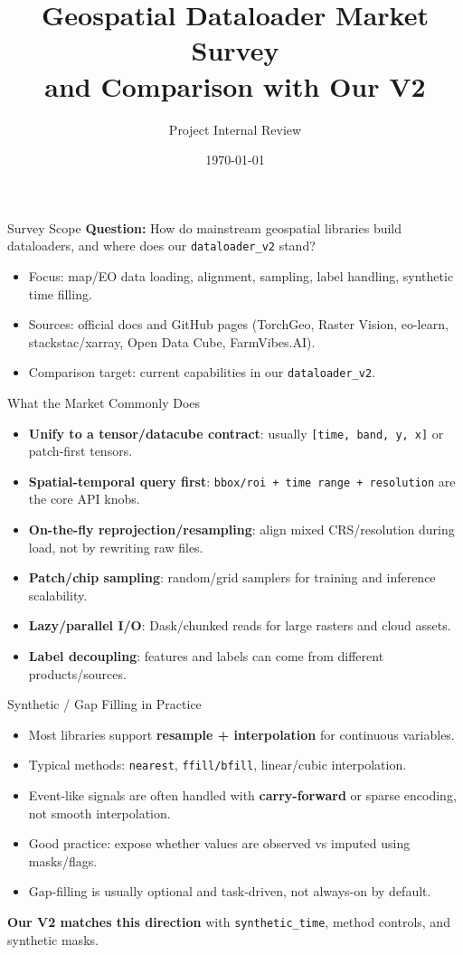 \documentclass{beamer}
\title{Geospatial Dataloader Market Survey\\and Comparison with Our V2}
\author{Project Internal Review}
\date{\today}
\begin{document}
\begin{frame}
  \titlepage
\end{frame}

\begin{frame}{Survey Scope}
\textbf{Question:} How do mainstream geospatial libraries build dataloaders, and where does our \texttt{dataloader\_v2} stand?
\vspace{0.5em}
\begin{itemize}
  \item Focus: map/EO data loading, alignment, sampling, label handling, synthetic time filling.
  \item Sources: official docs and GitHub pages (TorchGeo, Raster Vision, eo-learn, stackstac/xarray, Open Data Cube, FarmVibes.AI).
  \item Comparison target: current capabilities in our \texttt{dataloader\_v2}.
\end{itemize}
\end{frame}

\begin{frame}{What the Market Commonly Does}
\begin{itemize}
  \item \textbf{Unify to a tensor/datacube contract}: usually \texttt{[time, band, y, x]} or patch-first tensors.
  \item \textbf{Spatial-temporal query first}: \texttt{bbox/roi + time range + resolution} are the core API knobs.
  \item \textbf{On-the-fly reprojection/resampling}: align mixed CRS/resolution during load, not by rewriting raw files.
  \item \textbf{Patch/chip sampling}: random/grid samplers for training and inference scalability.
  \item \textbf{Lazy/parallel I/O}: Dask/chunked reads for large rasters and cloud assets.
  \item \textbf{Label decoupling}: features and labels can come from different products/sources.
\end{itemize}
\end{frame}

\begin{frame}{Synthetic / Gap Filling in Practice}
\begin{itemize}
  \item Most libraries support \textbf{resample + interpolation} for continuous variables.
  \item Typical methods: \texttt{nearest}, \texttt{ffill/bfill}, linear/cubic interpolation.
  \item Event-like signals are often handled with \textbf{carry-forward} or sparse encoding, not smooth interpolation.
  \item Good practice: expose whether values are observed vs imputed using masks/flags.
  \item Gap-filling is usually optional and task-driven, not always-on by default.
\end{itemize}
\vspace{0.4em}
\textbf{Our V2 matches this direction} with \texttt{synthetic\_time}, method controls, and synthetic masks.
\end{frame}
\end{document}
